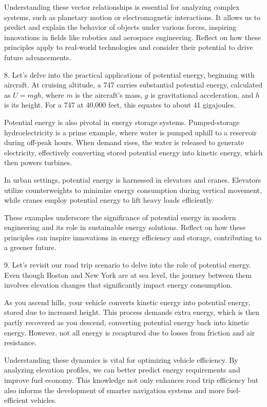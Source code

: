 \begin{tcolorbox}[size=title,opacityfill=0.05,breakable]
Understanding these vector relationships is essential for analyzing complex systems, such as planetary motion or electromagnetic interactions. It allows us to predict and explain the behavior of objects under various forces, inspiring innovations in fields like robotics and aerospace engineering. Reflect on how these principles apply to real-world technologies and consider their potential to drive future advancements.

8. Let's delve into the practical applications of potential energy, beginning with aircraft. At cruising altitude, a 747 carries substantial potential energy, calculated as \( U = mgh \), where \( m \) is the aircraft's mass, \( g \) is gravitational acceleration, and \( h \) is its height. For a 747 at 40,000 feet, this equates to about 41 gigajoules.

Potential energy is also pivotal in energy storage systems. Pumped-storage hydroelectricity is a prime example, where water is pumped uphill to a reservoir during off-peak hours. When demand rises, the water is released to generate electricity, effectively converting stored potential energy into kinetic energy, which then powers turbines.

In urban settings, potential energy is harnessed in elevators and cranes. Elevators utilize counterweights to minimize energy consumption during vertical movement, while cranes employ potential energy to lift heavy loads efficiently.

These examples underscore the significance of potential energy in modern engineering and its role in sustainable energy solutions. Reflect on how these principles can inspire innovations in energy efficiency and storage, contributing to a greener future.


9. Let's revisit our road trip scenario to delve into the role of potential energy. Even though Boston and New York are at sea level, the journey between them involves elevation changes that significantly impact energy consumption.

As you ascend hills, your vehicle converts kinetic energy into potential energy, stored due to increased height. This process demands extra energy, which is then partly recovered as you descend, converting potential energy back into kinetic energy. However, not all energy is recaptured due to losses from friction and air resistance.

Understanding these dynamics is vital for optimizing vehicle efficiency. By analyzing elevation profiles, we can better predict energy requirements and improve fuel economy. This knowledge not only enhances road trip efficiency but also informs the development of smarter navigation systems and more fuel-efficient vehicles.


\end{tcolorbox}
